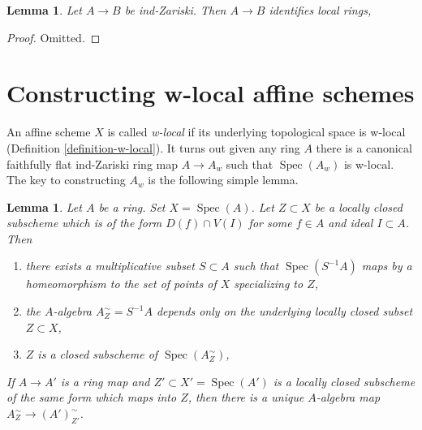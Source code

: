 \documentclass[10pt,a4paper]{article}
\theoremstyle{plain}
\newtheorem{lemma}[subsection]{Lemma}
\theoremstyle{definition}
\theoremstyle{remark}
\numberwithin{equation}{subsection}
\def\Spec{\mathop{\mathrm{Spec}}}
\begin{document}
\begin{lemma}
\label{lemma-ind-zariski-implies}
Let $A \to B$ be ind-Zariski. Then $A \to B$ identifies local rings,
\end{lemma}

\begin{proof}
Omitted.
\end{proof}







\section{Constructing w-local affine schemes}
\label{section-construction}

\noindent
An affine scheme $X$ is called {\it w-local} if its underlying
topological space is w-local (Definition \ref{definition-w-local}).
It turns out given any ring $A$ there is a canonical faithfully
flat ind-Zariski ring map $A \to A_w$ such that $\Spec(A_w)$ is
w-local. The key to constructing $A_w$ is the following simple lemma.

\begin{lemma}
\label{lemma-localization}
Let $A$ be a ring. Set $X = \Spec(A)$. Let $Z \subset X$ be a locally closed
subscheme which is of the form $D(f) \cap V(I)$ for some $f \in A$ and
ideal $I \subset A$. Then
\begin{enumerate}
\item there exists a multiplicative subset $S \subset A$ such that
$\Spec(S^{-1}A)$ maps by a homeomorphism to the set of points of $X$
specializing to $Z$,
\item the $A$-algebra $A_Z^\sim = S^{-1}A$ depends only on
the underlying locally closed subset $Z \subset X$,
\item $Z$ is a closed subscheme of $\Spec(A_Z^\sim)$,
\end{enumerate}
If $A \to A'$ is a ring map and $Z' \subset X' = \Spec(A')$ is a
locally closed subscheme of the same form which maps into $Z$,
then there is a unique $A$-algebra map
$A_Z^\sim \to (A')_{Z'}^\sim$.
\end{lemma}
\end{document}

